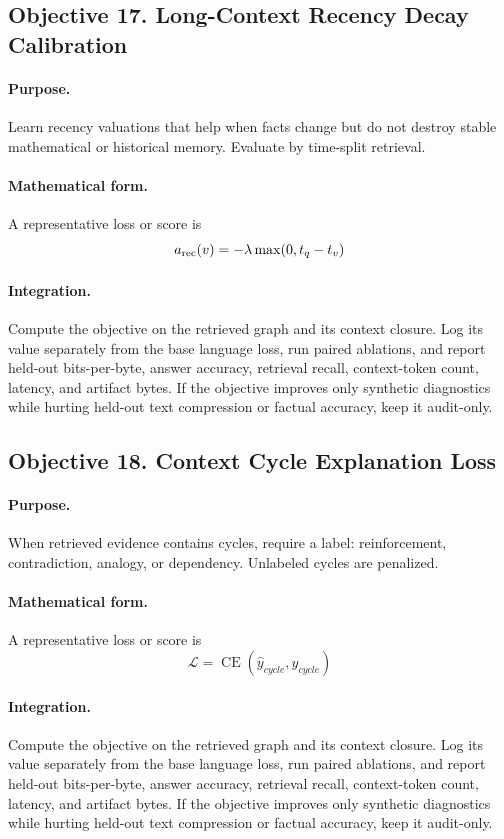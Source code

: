 \documentclass[11pt]{article}
\theoremstyle{definition}
\theoremstyle{remark}
\begin{document}
\subsection{Objective 17. Long-Context Recency Decay Calibration}
\paragraph{Purpose.} Learn recency valuations that help when facts change but do not destroy stable mathematical or historical memory. Evaluate by time-split retrieval.

\paragraph{Mathematical form.} A representative loss or score is
\[
    a_{\rm rec}(v)=-\lambda\max(0,t_q-t_v)
\]

\paragraph{Integration.} Compute the objective on the retrieved graph and its context closure. Log its value separately from the base language loss, run paired ablations, and report held-out bits-per-byte, answer accuracy, retrieval recall, context-token count, latency, and artifact bytes. If the objective improves only synthetic diagnostics while hurting held-out text compression or factual accuracy, keep it audit-only.


\subsection{Objective 18. Context Cycle Explanation Loss}
\paragraph{Purpose.} When retrieved evidence contains cycles, require a label: reinforcement, contradiction, analogy, or dependency. Unlabeled cycles are penalized.

\paragraph{Mathematical form.} A representative loss or score is
\[
    \mathcal L=\operatorname{CE}(\hat y_{cycle},y_{cycle})
\]

\paragraph{Integration.} Compute the objective on the retrieved graph and its context closure. Log its value separately from the base language loss, run paired ablations, and report held-out bits-per-byte, answer accuracy, retrieval recall, context-token count, latency, and artifact bytes. If the objective improves only synthetic diagnostics while hurting held-out text compression or factual accuracy, keep it audit-only.
\end{document}
